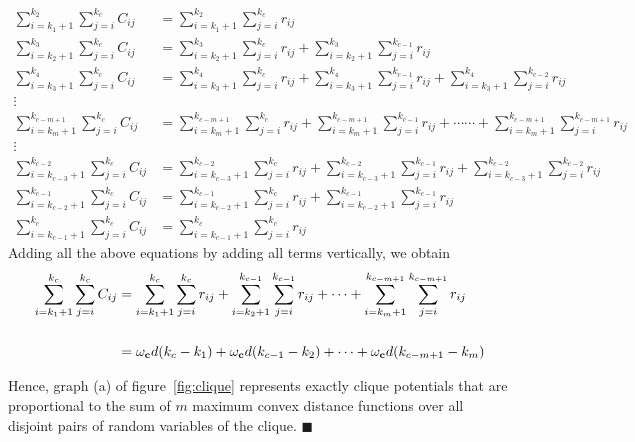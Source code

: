 \documentclass[10pt,letterpaper]{article}
\begin{document}
\begin{align*}
\sum_{i=k_{1}+1}^{k_{2}} \sum_{j=i}^{k_{c}} C_{ij} &= \sum_{i=k_{1}+1}^{k_{2}} \sum_{j=i}^{k_{c}} r_{ij}\\
\sum_{i=k_{2}+1}^{k_{3}} \sum_{j=i}^{k_{c}} C_{ij} &= \sum_{i=k_{2}+1}^{k_{3}} \sum_{j=i}^{k_{c}} r_{ij} + \sum_{i=k_{2}+1}^{k_{3}} \sum_{j=i}^{k_{c-1}} r_{ij}\\
\sum_{i=k_{3}+1}^{k_{4}} \sum_{j=i}^{k_{c}} C_{ij} &= \sum_{i=k_{3}+1}^{k_{4}} \sum_{j=i}^{k_{c}} r_{ij} + \sum_{i=k_{3}+1}^{k_{4}} \sum_{j=i}^{k_{c-1}} r_{ij} + \sum_{i=k_{3}+1}^{k_{4}} \sum_{j=i}^{k_{c-2}} r_{ij}\\
\vdots\\
\sum_{i=k_{m}+1}^{k_{c-m+1}} \sum_{j=i}^{k_{c}} C_{ij} &= \sum_{i=k_{m}+1}^{k_{c-m+1}} \sum_{j=i}^{k_{c}} r_{ij} + \sum_{i=k_{m}+1}^{k_{c-m+1}} \sum_{j=i}^{k_{c-1}} r_{ij} +\dotsb\dotsb+ \sum_{i=k_{m}+1}^{k_{c-m+1}} \sum_{j=i}^{k_{c-m+1}} r_{ij}\\
\vdots\\
\sum_{i=k_{c-3}+1}^{k_{c-2}} \sum_{j=i}^{k_{c}} C_{ij} &= \sum_{i=k_{c-3}+1}^{k_{c-2}} \sum_{j=i}^{k_{c}} r_{ij} + \sum_{i=k_{c-3}+1}^{k_{c-2}} \sum_{j=i}^{k_{c-1}} r_{ij} + \sum_{i=k_{c-3}+1}^{k_{c-2}} \sum_{j=i}^{k_{c-2}} r_{ij}\\
\sum_{i=k_{c-2}+1}^{k_{c-1}} \sum_{j=i}^{k_{c}} C_{ij} &= \sum_{i=k_{c-2}+1}^{k_{c-1}} \sum_{j=i}^{k_{c}} r_{ij} + \sum_{i=k_{c-2}+1}^{k_{c-1}} \sum_{j=i}^{k_{c-1}} r_{ij}\\
\sum_{i=k_{c-1}+1}^{k_{c}} \sum_{j=i}^{k_{c}} C_{ij} &= \sum_{i=k_{c-1}+1}^{k_{c}} \sum_{j=i}^{k_{c}} r_{ij}
\end{align*}
Adding all the above equations by adding all terms vertically, we obtain
\begin{align*}
\sum_{i=k_{1}+1}^{k_{c}} \sum_{j=i}^{k_{c}} C_{ij} &= \sum_{i=k_{1}+1}^{k_{c}} \sum_{j=i}^{k_{c}} r_{ij} +
\sum_{i=k_{2}+1}^{k_{c-1}} \sum_{j=i}^{k_{c-1}} r_{ij} +\dotsb+ 
\sum_{i=k_{m}+1}^{k_{c-m+1}} \sum_{j=i}^{k_{c-m+1}} r_{ij}\\\\
&= \omega_{\bf{c}}d(k_{c}-k_{1}) + \omega_{\bf{c}}d(k_{c-1}-k_{2}) +\dotsb+
\omega_{\bf{c}}d(k_{c-m+1}-k_{m})
\end{align*}

Hence, graph (a) of figure~\ref{fig:clique} represents exactly clique potentials that are proportional to the sum of $m$ maximum convex distance functions over all disjoint pairs of random variables of the clique. \hspace{6mm} $\blacksquare$
\end{document}
